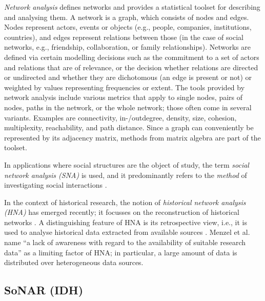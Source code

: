 \emph{Network analysis}
defines networks and provides a statistical toolset for describing and analysing them.
A network is a graph, which consists of nodes and edges.
Nodes represent actors, events or objects (e.g., people, companies, institutions, countries),
and edges represent relations between those (in the case of social networks, e.g.,
friendship, collaboration, or family relationships).
Networks are defined via certain modelling decisions
such as the commitment to a set of actors and relations that are of relevance,
or the decision whether relations are directed or undirected
and whether they are dichotomous (an edge is present or not)
or weighted by values representing frequencies or extent.
The tools provided by network analysis include
various metrics that apply to single nodes, pairs of nodes, paths in the network,
or the whole network; those often come in several variants.
Examples are connectivity, in-/outdegree, density,
size, cohesion, multiplexity, reachability, and path distance.
Since a graph can conveniently be represented by its adjacency matrix,
methods from matrix algebra are part of the toolset.

In applications where social structures are the object of study,
the term \emph{social network analysis (SNA)} is used,
and it predominantly refers to the \emph{method} of investigating
social interactions \autocite{Otte2002}.

In the context of historical research,
the notion of \emph{historical network analysis (HNA)}
has emerged recently; it focusses on the reconstruction of
historical networks \autocite{Menzel2020}.
A distinguishing feature of HNA is its retrospective view,
i.e., it is used to analyse historical data extracted
from available sources \autocite{Fangerau2022}.
Menzel et al.\ \autocite*{Menzel2020} name
\enquote{a lack of awareness with regard to the availability of suitable research data}
as a limiting factor of HNA;
in particular, a large amount of data is distributed over heterogeneous data sources.

\subsection{SoNAR (IDH)}

